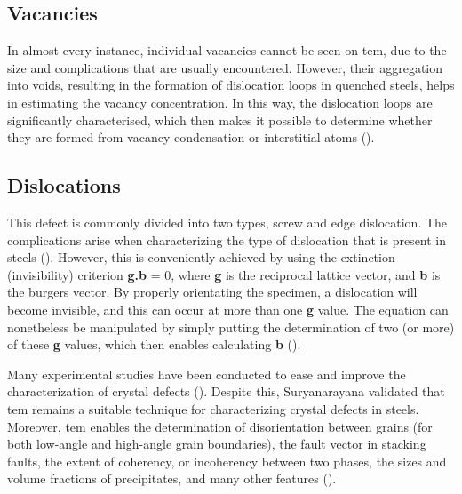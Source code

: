 \subsection{Vacancies} 
 In almost every instance, individual vacancies cannot be seen on \acrshort{tem}, due to the size and complications that are usually encountered. However, their aggregation into voids, resulting in the formation of dislocation loops in quenched steels, helps in estimating the vacancy concentration. In this way, the dislocation loops are significantly characterised, which then makes it possible to determine whether they are formed from vacancy condensation or interstitial atoms (\cite{suryanarayana2017microstructure}).

\subsection{Dislocations}
This defect is commonly divided into two types, screw and edge dislocation. The complications arise when characterizing the type of dislocation that is present in steels (\cite{jones2012engineering}). However, this is conveniently achieved by using the extinction (invisibility) criterion \textbf{g.b} = 0, where \textbf{g} is the reciprocal lattice vector, and \textbf{b} is the burgers vector. By properly orientating the specimen, a dislocation will become invisible, and this can occur at more than one \textbf{g} value. The equation can nonetheless be manipulated by simply putting the determination of two (or more) of these \textbf{g} values, which then enables calculating \textbf{b} (\cite{suryanarayana2017microstructure}).

Many experimental studies have been conducted to ease and improve the characterization of crystal defects (\cite{george2002introduction, bhadeshia2017steels, karayan2014weld}). Despite this, Suryanarayana \cite{suryanarayana2017microstructure} validated that \acrshort{tem} remains a suitable technique for characterizing crystal defects in steels. Moreover, \acrshort{tem} enables the determination of disorientation between grains (for both low-angle and high-angle grain boundaries), the fault vector in stacking faults, the extent of coherency, or incoherency between two phases, the sizes and volume fractions of precipitates, and many other features (\cite{suryanarayana2017microstructure}).

